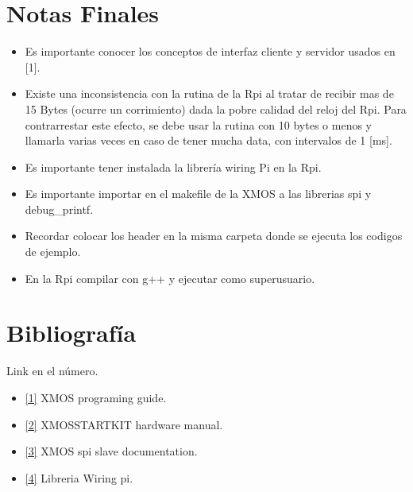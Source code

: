 \documentclass{article}
\begin{document}
\section{Notas Finales}
\begin{itemize}
\item Es importante conocer los conceptos de interfaz cliente y servidor usados en [1].
\item Existe una inconsistencia con la rutina de la Rpi al tratar de recibir mas de 15 Bytes (ocurre un corrimiento) dada la pobre calidad del reloj del Rpi. Para contrarrestar este efecto, se debe usar la rutina con 10 bytes o menos y llamarla varias veces en caso de tener mucha data, con intervalos de 1 [ms].
\item Es importante tener instalada la librería wiring Pi en la Rpi.
\item Es importante importar en el makefile de la XMOS a las librerias spi y debug\_printf.
\item Recordar colocar los header en la misma carpeta donde se ejecuta los codigos de ejemplo.
  \item En la Rpi compilar con g++ y ejecutar como superusuario.
  \end{itemize}
\section{Bibliografía}
Link en el número.
\begin{itemize}
\item\href{https://www.google.com/url?sa=t&rct=j&q=&esrc=s&source=web&cd=2&cad=rja&uact=8&ved=0ahUKEwjwqO3awdHTAhWDEpAKHURlDr8QFggrMAE&url=https%3A%2F%2Fwww.xmos.com%2Fdownload%2Fprivate%2FXMOS-Programming-Guide-(documentation)(E).pdf&usg=AFQjCNEo1fItwfoJAkXCRro7vJsQjMuLLQ&sig2=PuG2SJMDRsxElWmgEYTTyg}{[1]} XMOS programing guide.
\item\href{https://www.google.com/url?sa=t&rct=j&q=&esrc=s&source=web&cd=2&cad=rja&uact=8&ved=0ahUKEwip7sXCwtHTAhWDDpAKHR1EBkYQFgguMAE&url=https%3A%2F%2Fwww.xmos.com%2Fdownload%2Fprivate%2FstartKIT-Hardware-Manual%25281.0%2529.pdf&usg=AFQjCNFX6eY8WwRSqBPBgmR2k5FZZ1n9zw&sig2=uiL-EIwlkLmJBVE9CTpltQ}{[2]} XMOSSTARTKIT hardware manual.
\item\href{https://www.google.com/url?sa=t&rct=j&q=&esrc=s&source=web&cd=3&cad=rja&uact=8&ved=0ahUKEwjcjpXPwtHTAhUBIpAKHXZuC_cQFggwMAI&url=https%3A%2F%2Fwww.xmos.com%2Fdownload%2Fprivate%2FXMOS-xSOFTip-SPI-Slave-Component-(documentation)(1.3.1rc1.a).pdf&usg=AFQjCNFsuUmAHxuceyPbnxXnlDEBVuXtzw&sig2=obcpHkq4W8-zkXGWF2t1zA}{[3]} XMOS spi slave documentation.
\item\href{http://wiringpi.com/reference/}{[4]} Libreria Wiring pi.
  \end{itemize}

\end{document}

